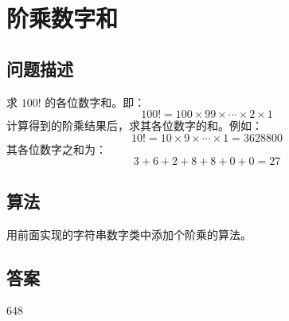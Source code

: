 \section{阶乘数字和}\label{sec:problem20}
\subsection{问题描述}
\begin{tcolorbox}
求 $100!$ 的各位数字和。即：
\[
100! = 100 \times 99 \times \cdots \times 2 \times 1
\]
计算得到的阶乘结果后，求其各位数字的和。例如：
\[
10! = 10 \times 9 \times \cdots \times 1 = 3628800
\]
其各位数字之和为：
\[
3 + 6 + 2 + 8 + 8 + 0 + 0 = 27
\]
\end{tcolorbox}

\subsection{算法}
用前面实现的字符串数字类中添加个阶乘的算法。

\subsection{答案}
648
